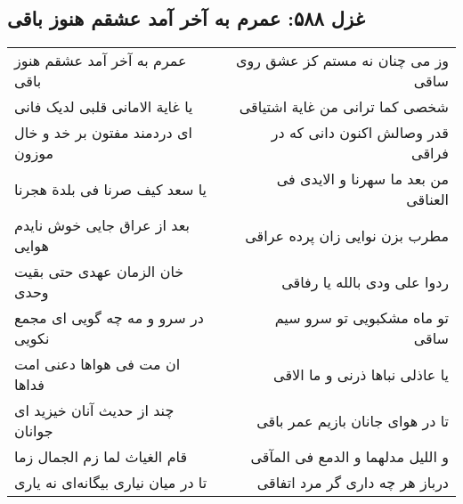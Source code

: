 \begin{center}
\section*{غزل ۵۸۸: عمرم به آخر آمد عشقم هنوز باقی}
\label{sec:588}
\begin{longtable}{l p{0.5cm} r}
عمرم به آخر آمد عشقم هنوز باقی
&&
وز می چنان نه مستم کز عشق روی ساقی
\\
یا غایة الامانی قلبی لدیک فانی
&&
شخصی کما ترانی من غایة اشتیاقی
\\
ای دردمند مفتون بر خد و خال موزون
&&
قدر وصالش اکنون دانی که در فراقی
\\
یا سعد کیف صرنا فی بلدة هجرنا
&&
من بعد ما سهرنا و الایدی فی العناقی
\\
بعد از عراق جایی خوش نایدم هوایی
&&
مطرب بزن نوایی زان پرده عراقی
\\
خان الزمان عهدی حتی بقیت وحدی
&&
ردوا علی ودی بالله یا رفاقی
\\
در سرو و مه چه گویی ای مجمع نکویی
&&
تو ماه مشکبویی تو سرو سیم ساقی
\\
ان مت فی هواها دعنی امت فداها
&&
یا عاذلی نباها ذرنی و ما الاقی
\\
چند از حدیث آنان خیزید ای جوانان
&&
تا در هوای جانان بازیم عمر باقی
\\
قام الغیاث لما زم الجمال زما
&&
و اللیل مدلهما و الدمع فی المآقی
\\
تا در میان نیاری بیگانه‌ای نه یاری
&&
درباز هر چه داری گر مرد اتفاقی
\\
\end{longtable}
\end{center}
